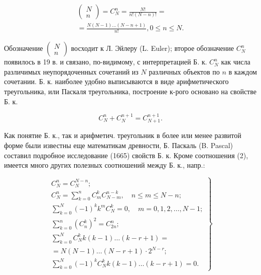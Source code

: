 \documentclass[10pt]{article}
\begin{document}
\[

\begin{gathered}

\left(\begin{array}{l}

N \\

n

\end{array}\right)=C_{N}^{n}=\frac{N !}{n !(N-n) !}= \\

=\frac{N(N-1) \ldots(N-n+1)}{n !}, 0 \leqslant n \leqslant N .

\end{gathered}

\]



Обозначение $\left(\begin{array}{l}N \\ n\end{array}\right)$ восходит к Л. Эйлеру (L. Euler); второе обозначение $C_{N}^{n}$ появилось в 19 в. и связано, по-видимому, с интерпретацией Б. к. $C_{N}^{n}$ как числа различимых неупорядоченных сочетаний из $N$ различных объектов по $n$ в каждом сочетании. Б. к. наиболее удобно выписываются в виде арифметического треугольника, или Паскаля треугольника, построение к-рого основано на свойстве Б. к.



\[

C_{N}^{n}+C_{N}^{n+1}=C_{N+1}^{n+1} .

\]



Как понятие Б. к., так и арифметич. треугольник в более или менее развитой форме были известны еще математикам древности, Б. Паскаль (B. Pascal) составил подробное исследование (1665) свойств Б. к. Кроме соотношения (2), имеется много других полезных соотношений между Б. к., напр.:



\[

\left.\begin{array}{c}

C_{N}^{n}=C_{N}^{N-n} ; \\

C_{N}^{n}=\sum_{k=0}^{n} C_{m}^{k} C_{N-m}^{n-k}, \quad n \leqslant m \leqslant N-n ; \\

\sum_{k=0}^{N}(-1)^{k} k^{m} C_{N}^{k}=0, \quad m=0,1,2, \ldots, N-1 ; \\

\sum_{k=0}^{n}\left(C_{n}^{k}\right)^{2}=C_{2 n}^{n} ; \\

\sum_{k=0}^{N} C_{N}^{k} k(k-1) \ldots(k-r+1)= \\

=N(N-1) \ldots(N-r+1) \cdot 2^{N-r} ; \\

\sum_{k=0}^{N}(-1)^{k} C_{N}^{k} k(k-1) \ldots(k-r+1)=0 .

\end{array}\right\}

\]
\end{document}
